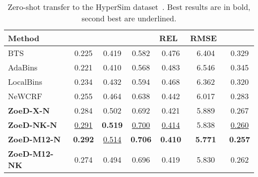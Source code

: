 \documentclass[10pt,twocolumn,letterpaper]{article}
\begin{document}
\begin{table}[htb]
\centering
\setlength{\tabcolsep}{3pt} \small
\begin{tabular}{@{}lcccccc@{}}
\toprule
Method &  &  &  & REL~ & RMSE~ & \\ \midrule
BTS~\cite{bts_lee2019big}               & 0.225     & 0.419     & 0.582     & 0.476     & 6.404     & 0.329    \\ 
AdaBins~\cite{bhat2021adabins}          & 0.221     & 0.410     & 0.568     & 0.483     & 6.546     & 0.345    \\ 
LocalBins~\cite{bhat2022localbins}      & 0.234 & 0.432 & 0.594 &     0.468 &  6.362 &    0.320     \\
NeWCRF~\cite{yuan2022new}               & 0.255     & 0.464     & 0.638     & 0.442     & 6.017     & 0.283     \\ 
\midrule
\textbf{ZoeD-X-N}       & 0.284 & 0.502 & 0.692 &     0.421 &  5.889 &    0.267 \\ 
\textbf{ZoeD-NK-N}      &  \underline{0.291} & \textbf{0.519} & \underline{0.700}   &     \underline{0.414} &  5.838 &    \underline{0.260} \\
\textbf{ZoeD-M12-N}     & \textbf{0.292} & \underline{0.514} & \textbf{0.706} & \textbf{0.410} & \textbf{5.771} &   \textbf{0.257} \\
\textbf{ZoeD-M12-NK}    &  0.274 & 0.494 & 0.696 & 0.419 & 5.830 &   0.262 \\
\bottomrule
\end{tabular}
\caption{Zero-shot transfer to the HyperSim dataset~\cite{roberts:2021}. Best results are in bold, second best are underlined.}
\label{tab:hypersim-full}
\end{table}
\end{document}
